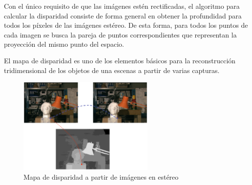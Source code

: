 Con el único requisito de que las imágenes estén rectificadas, el algoritmo para
calcular la disparidad consiste de forma general en obtener la profundidad para
todos los píxeles de las imágenes estéreo. De esta forma, para todos los puntos
de cada imagen se busca la pareja de puntos correspondientes que representan la
proyección del mismo punto del espacio.

El mapa de disparidad es uno de los elementos básicos para la reconstrucción
tridimensional de los objetos de una escenas a partir de varias capturas.

\begin{figure}[!th]
  \begin{center}
    \includegraphics[width=0.6\textwidth]{images/cap2/MapaDisparidad.eps}
    \caption{Mapa de disparidad a partir de imágenes en estéreo}
    \label{fig:MapaDisparidad}
  \end{center}
\end{figure}






